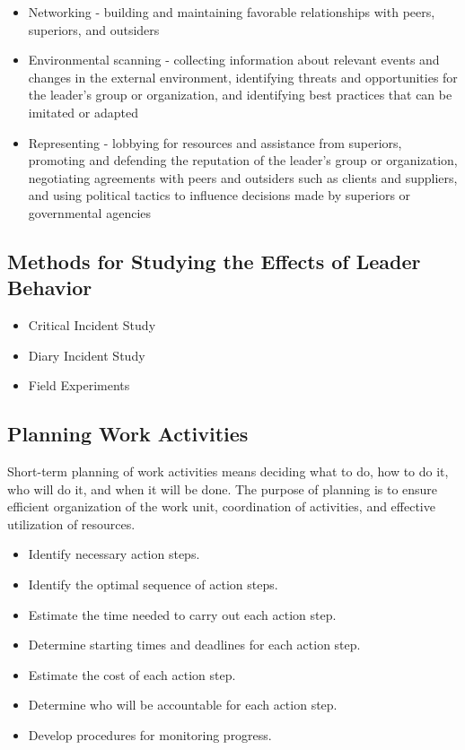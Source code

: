 \begin{itemize}
	\begin{itemize}
		\item Networking - building and maintaining favorable relationships with peers, superiors, and outsiders
		\item Environmental scanning - collecting information about relevant events and changes in the external environment, identifying threats and opportunities for the leader’s group or organization, and identifying best practices that can be imitated or adapted
		\item Representing - lobbying for resources and assistance from superiors, promoting and defending the reputation of the leader’s group or organization, negotiating agreements with peers and outsiders such as clients and suppliers, and using political tactics to influence decisions made by superiors or governmental agencies
	\end{itemize}
\end{itemize}


\subsection{Methods for Studying the Effects of Leader Behavior} %
\label{ssub:methCritical Incident Study}

	\begin{itemize}
		\item Critical Incident Study
		\item Diary Incident Study
		\item Field Experiments
	\end{itemize}


\subsection{Planning Work Activities} %
\label{ssub:planning_work_activities}
Short-term planning of work activities means deciding what to do, how to do it, who will do it, and when it will be done. The purpose of planning is to ensure efficient organization of the work unit, coordination of activities, and effective utilization of resources.

\begin{itemize}
	\item Identify necessary action steps.
	\item Identify the optimal sequence of action steps.
	\item Estimate the time needed to carry out each action step.
	\item Determine starting times and deadlines for each action step.
	\item Estimate the cost of each action step.
	\item Determine who will be accountable for each action step.
	\item Develop procedures for monitoring progress.
\end{itemize}


